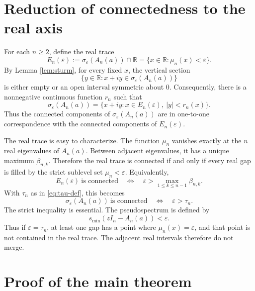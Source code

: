\documentclass[11pt]{amsart}
\numberwithin{equation}{section}
\newcommand{\R}{\mathbb R}
\newcommand{\eps}{\varepsilon}
\begin{document}
\section{Reduction of connectedness to the real axis}

For each \(n\ge2\), define the real trace
\begin{equation}\label{eq:real-trace}
E_n(\eps)
:=
\sigma_\eps(A_n(a))\cap\R
=
\{x\in\R:\mu_n(x)<\eps\}.
\end{equation}
By Lemma \ref{lem:sturm}, for every fixed \(x\), the vertical section
\[
\{y\in\R:x+iy\in\sigma_\eps(A_n(a))\}
\]
is either empty or an open interval symmetric about \(0\).  Consequently, there is a nonnegative continuous function \(r_n\) such that
\begin{equation}\label{eq:pseudospectrum-sections}
\sigma_\eps(A_n(a))
=
\{x+iy:x\in E_n(\eps),\ |y|<r_n(x)\}.
\end{equation}
Thus the connected components of \(\sigma_\eps(A_n(a))\) are in one-to-one correspondence with the connected components of \(E_n(\eps)\).

The real trace is easy to characterize.  The function \(\mu_n\) vanishes exactly at the \(n\) real eigenvalues of \(A_n(a)\).  Between adjacent eigenvalues, it has a unique maximum \(\beta_{n,k}\).  Therefore the real trace is connected if and only if every real gap is filled by the strict sublevel set \(\mu_n<\eps\).  Equivalently,
\begin{equation}\label{eq:real-trace-connected}
E_n(\eps)\ \text{is connected}
\quad\Longleftrightarrow\quad
\eps>\max_{1\le k\le n-1}\beta_{n,k}.
\end{equation}
With \(\tau_n\) as in \eqref{eq:tau-def}, this becomes
\begin{equation}\label{eq:pseudospectrum-connected}
\sigma_\eps(A_n(a))\ \text{is connected}
\quad\Longleftrightarrow\quad
\eps>\tau_n.
\end{equation}
The strict inequality is essential.  The pseudospectrum is defined by
\[
s_{\min}(zI_n-A_n(a))<\eps.
\]
Thus if \(\eps=\tau_n\), at least one gap has a point where \(\mu_n(x)=\eps\), and that point is not contained in the real trace.  The adjacent real intervals therefore do not merge.

\section{Proof of the main theorem}
\end{document}
